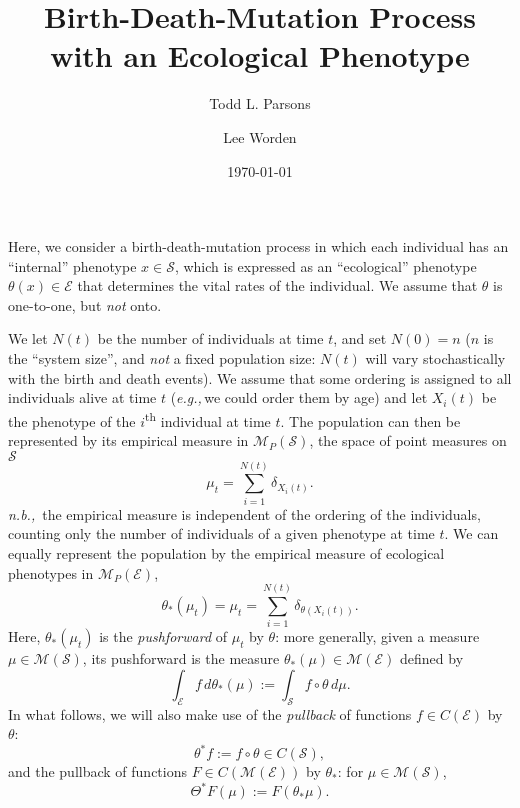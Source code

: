 \documentclass[11pt]{amsart}
\theoremstyle{remark}
\theoremstyle{definition}
\newcommand{\eg}{\textit{e.g.,}\,}
\newcommand{\nb}{\textit{n.b.,}\, }
\begin{document}
\title{Birth-Death-Mutation Process with an Ecological Phenotype}
\author{Todd L. Parsons}
\address{Laboratoire de Probabilit\'es, Statistique et Mod\'elisation, UMR8001, Sorbonne Universit\'e, Paris, 75005, France.}
\author{Lee Worden}
\address{Oakland, Calif., USA}


\date{\today}



\maketitle

Here, we consider a birth-death-mutation process in which each individual has an ``internal'' phenotype $x \in \mathcal{S}$, which is expressed as an ``ecological'' phenotype $\theta(x) \in \mathcal{E}$ that determines the vital rates of the individual.  We assume that $\theta$ is one-to-one, but \emph{not} onto.  

We let $N(t)$ be the number of individuals at time $t$, and set $N(0) = n$ ($n$ is the ``system size'', and \emph{not} a fixed population size: $N(t)$ will vary stochastically with the birth and death events).  We assume that some ordering is assigned to all individuals alive at time $t$ (\eg we could order them by age) and let $X_{i}(t)$ be the phenotype of the $i$\textsuperscript{th} individual at time $t$.  The population can then be represented by its empirical measure in $\mathcal{M}_{P}(\mathcal{S})$, the space of point measures on $\mathcal{S}$
\[
	 \mu_{t} = \sum_{i=1}^{N(t)} \delta_{X_{i}(t)}.
\]
\nb the empirical measure is independent of the ordering of the individuals, counting only the number of individuals of a given phenotype at time $t$.  We can equally represent the population by the empirical measure of ecological phenotypes in $\mathcal{M}_{P}(\mathcal{E})$, 
\[
	\theta_{*}(\mu_{t}) = \mu_{t} = \sum_{i=1}^{N(t)} \delta_{\theta(X_{i}(t))}.
\]
Here, $\theta_{*}(\mu_{t})$ is the \textit{pushforward} of $\mu_{t}$ by $\theta$: more generally, given a measure $\mu \in \mathcal{M}(\mathcal{S})$, its pushforward is the measure $\theta_{*}(\mu) \in \mathcal{M}(\mathcal{E})$ defined by
\[
	\int_{\mathcal{E}} f\, d\theta_{*}(\mu) := \int_{\mathcal{S}} f\circ\theta\,  d\mu.
\] 
In what follows, we will also make use of the \textit{pullback} of functions $f \in C(\mathcal{E})$ by $\theta$:
\[
	\theta^{*}f := f\circ\theta \in C(\mathcal{S}),
\]
and the pullback of functions $F \in C(\mathcal{M}(\mathcal{E}))$ by $\theta_{*}$: for $\mu \in \mathcal{M}(\mathcal{S})$,
\[
	\Theta^{*}F(\mu) := F(\theta_{*}\mu).
\]
\end{document}
